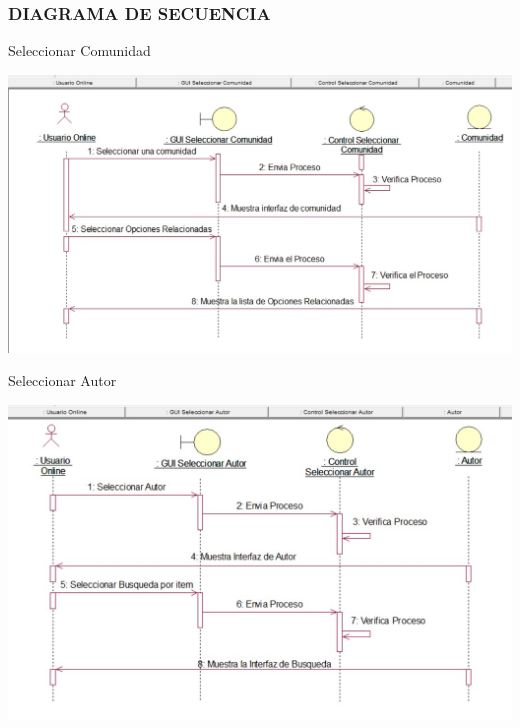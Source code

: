\subsubsection{DIAGRAMA DE SECUENCIA}
\thinspace
\thinspace
\thinspace
Seleccionar Comunidad
\thinspace
\thinspace
\thinspace
\thinspace
\thinspace
\thinspace
\thinspace
\thinspace
\thinspace
\thinspace
\thinspace
\thinspace
\begin{center}
\includegraphics[width=14cm]{./Imagenes/Secuencia1}
\end{center}
\thinspace
\thinspace
\thinspace
\thinspace
\thinspace
\thinspace
\thinspace
\thinspace
\thinspace
\thinspace
\thinspace
\thinspace
\thinspace
\thinspace
Seleccionar Autor
\thinspace
\thinspace
\thinspace
\thinspace
\thinspace
\thinspace
\thinspace
\thinspace
\thinspace
\thinspace
\thinspace
\thinspace
\begin{center}
\includegraphics[width=14cm]{./Imagenes/Secuencia2}
\end{center}
\thinspace
\thinspace
\thinspace
\thinspace
\thinspace
\thinspace
\thinspace
\thinspace
\thinspace
